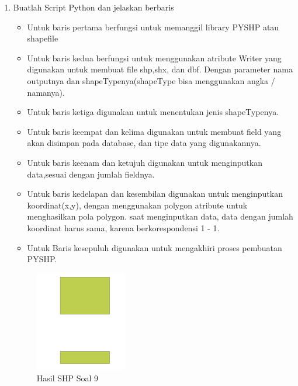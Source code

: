 \begin{enumerate}
	\item Buatlah Script Python dan jelaskan berbaris
	
	\begin{itemize}
		\item Untuk baris pertama berfungsi untuk memanggil library PYSHP atau shapefile
		\item Untuk baris kedua berfungsi untuk menggunakan atribute Writer yang digunakan untuk membuat file shp,shx, dan dbf. \hfill\break Dengan parameter nama outputnya dan shapeTypenya(shapeType bisa menggunakan angka / namanya).
		\item Untuk baris ketiga digunakan untuk menentukan jenis shapeTypenya.
		\item Untuk baris keempat dan kelima digunakan untuk membuat field yang akan disimpan pada database, dan tipe data yang digunakannya.
		\item Untuk baris keenam dan ketujuh digunakan untuk menginputkan data,sesuai dengan jumlah fieldnya.
		\item Untuk baris kedelapan dan kesembilan digunakan untuk menginputkan koordinat(x,y), dengan menggunakan polygon atribute untuk menghasilkan pola polygon. \hfill\break
		saat menginputkan data, data dengan jumlah koordinat harus sama, karena berkorespondensi 1 - 1.
		\item Untuk Baris kesepuluh digunakan untuk mengakhiri proses pembuatan PYSHP.
	\end{itemize}
	\hfill\break
	\begin{figure}[H]
		\includegraphics[width=4cm]{figures/1174027/2/soal9.png}
		\centering
		\caption{Hasil SHP Soal 9}
	\end{figure}


\end{enumerate}
